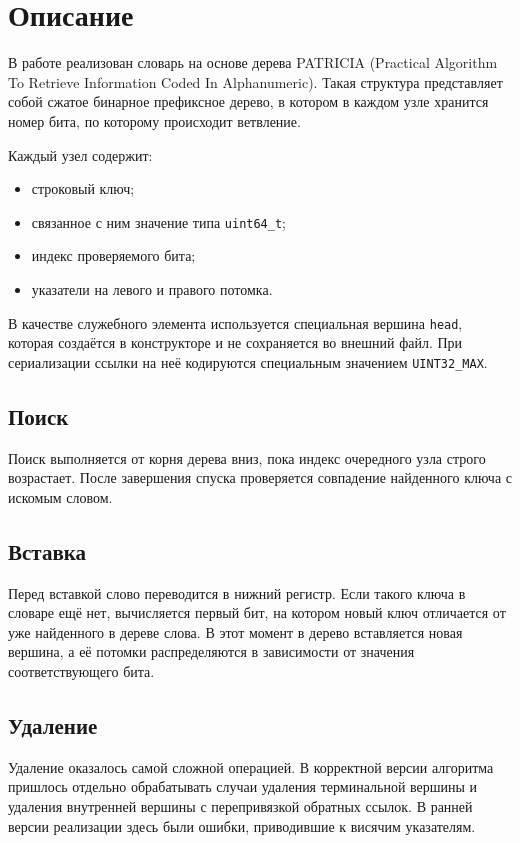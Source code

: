 \section{Описание}

В работе реализован словарь на основе дерева PATRICIA (Practical Algorithm To Retrieve Information Coded In Alphanumeric).
Такая структура представляет собой сжатое бинарное префиксное дерево, в котором в каждом узле хранится номер бита, по которому происходит ветвление.

Каждый узел содержит:
\begin{itemize}
    \item строковый ключ;
    \item связанное с ним значение типа \texttt{uint64\_t};
    \item индекс проверяемого бита;
    \item указатели на левого и правого потомка.
\end{itemize}

В качестве служебного элемента используется специальная вершина \texttt{head}, которая создаётся в конструкторе и не сохраняется во внешний файл. При сериализации ссылки на неё кодируются специальным значением \texttt{UINT32\_MAX}.

\subsection{Поиск}

Поиск выполняется от корня дерева вниз, пока индекс очередного узла строго возрастает. После завершения спуска проверяется совпадение найденного ключа с искомым словом.

\subsection{Вставка}

Перед вставкой слово переводится в нижний регистр. Если такого ключа в словаре ещё нет, вычисляется первый бит, на котором новый ключ отличается от уже найденного в дереве слова. В этот момент в дерево вставляется новая вершина, а её потомки распределяются в зависимости от значения соответствующего бита.

\subsection{Удаление}

Удаление оказалось самой сложной операцией. В корректной версии алгоритма пришлось отдельно обрабатывать случаи удаления терминальной вершины и удаления внутренней вершины с перепривязкой обратных ссылок. В ранней версии реализации здесь были ошибки, приводившие к висячим указателям.

